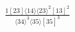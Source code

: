\documentclass[varwidth, border=5pt]{standalone}
\begin{document}
\begin{my}
$\begin{gathered}
\scriptscriptstyle\frac{1[23]⟨14⟩⟨23⟩^2[13]^2}{⟨34⟩^3⟨35⟩[35]^3}
\end{gathered}$
\end{my}
\end{document}
